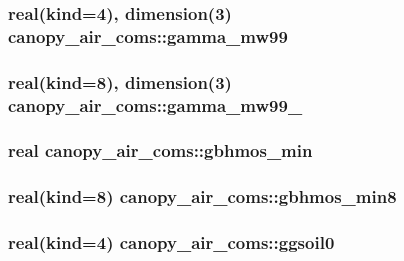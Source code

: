 \subsubsection[{gamma\+\_\+mw99}]{\setlength{\rightskip}{0pt plus 5cm}real(kind=4), dimension(3) canopy\+\_\+air\+\_\+coms\+::gamma\+\_\+mw99}\label{namespacecanopy__air__coms_a80914f4f0e8ab35603807486ea39940e}
\hypertarget{namespacecanopy__air__coms_abfa660e21167dc9825089920687f3aae}{}
\subsubsection[{gamma\+\_\+mw99\+\_\+8}]{\setlength{\rightskip}{0pt plus 5cm}real(kind=8), dimension(3) canopy\+\_\+air\+\_\+coms\+::gamma\+\_\+mw99\+\_}\label{namespacecanopy__air__coms_abfa660e21167dc9825089920687f3aae}
\hypertarget{namespacecanopy__air__coms_abe79d14b93c9428f34d88610142bc148}{}
\subsubsection[{gbhmos\+\_\+min}]{\setlength{\rightskip}{0pt plus 5cm}real canopy\+\_\+air\+\_\+coms\+::gbhmos\+\_\+min}\label{namespacecanopy__air__coms_abe79d14b93c9428f34d88610142bc148}
\hypertarget{namespacecanopy__air__coms_af56b6b535e7f020cae8112c71a4f8a87}{}
\subsubsection[{gbhmos\+\_\+min8}]{\setlength{\rightskip}{0pt plus 5cm}real(kind=8) canopy\+\_\+air\+\_\+coms\+::gbhmos\+\_\+min8}\label{namespacecanopy__air__coms_af56b6b535e7f020cae8112c71a4f8a87}
\hypertarget{namespacecanopy__air__coms_ac69a764f05bd0350e81b9b0dc1906fe6}{}
\subsubsection[{ggsoil0}]{\setlength{\rightskip}{0pt plus 5cm}real(kind=4) canopy\+\_\+air\+\_\+coms\+::ggsoil0}\label{namespacecanopy__air__coms_ac69a764f05bd0350e81b9b0dc1906fe6}
\hypertarget{namespacecanopy__air__coms_ace11cb0bb5a5d94330e33907db547ab1}{}
